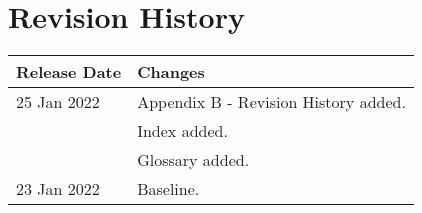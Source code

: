  

\chapter[Revision History]{Revision History}

\begin{tabular}{|p{3cm}|p{13cm}|}
\hline
\textbf{Release Date} & \textbf{Changes} \\
\hline
25 Jan 2022 & Appendix B - Revision History added.\\
& Index added.\\
& Glossary added.\\
\hline
23 Jan 2022 & Baseline.\\
\hline
\end{tabular}

